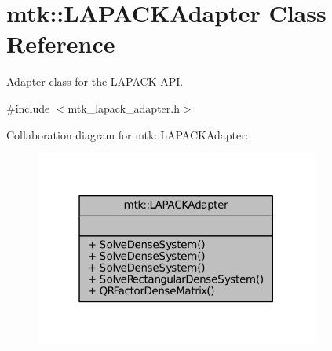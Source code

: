 \hypertarget{classmtk_1_1LAPACKAdapter}{\section{mtk\+:\+:L\+A\+P\+A\+C\+K\+Adapter Class Reference}
\label{classmtk_1_1LAPACKAdapter}
}


Adapter class for the L\+A\+P\+A\+C\+K A\+P\+I.  




{\ttfamily \#include $<$mtk\+\_\+lapack\+\_\+adapter.\+h$>$}



Collaboration diagram for mtk\+:\+:L\+A\+P\+A\+C\+K\+Adapter\+:\nopagebreak
\begin{figure}[H]
\begin{center}
\leavevmode
\includegraphics[width=265pt]{classmtk_1_1LAPACKAdapter__coll__graph}
\end{center}
\end{figure}
